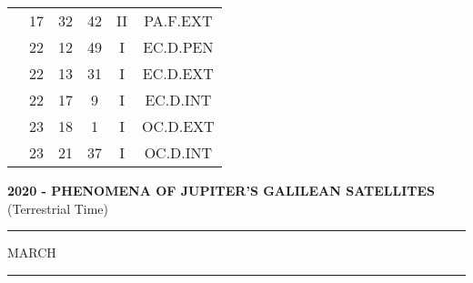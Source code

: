 \documentclass[12pt, a4paper]{article}
\begin{document}
\begin{multicols}{3}
{\begin{tabular}{c c c c c c}
	 	 	 	 & 17 & 32 & 42 & II & PA.F.EXT\\%
	 	 	 	 & 22 & 12 & 49 & I & EC.D.PEN\\%
	 	 	 	 & 22 & 13 & 31 & I & EC.D.EXT\\%
	 	 	 	 & 22 & 17 & 9 & I & EC.D.INT\\%
	 	 	 	 & 23 & 18 & 1 & I & OC.D.EXT\\%
	 	 	 	 & 23 & 21 & 37 & I & OC.D.INT\\%
	 	 \end{tabular}
 	}
\end{multicols}
\textbf{2020 - PHENOMENA OF JUPITER'S GALILEAN SATELLITES}\\(Terrestrial Time) 
\vspace{0.1cm} \hrule \vspace{0.1cm}
MARCH\vspace{0.1cm}
\hrule
\vspace{-0.2cm}
\end{document}
